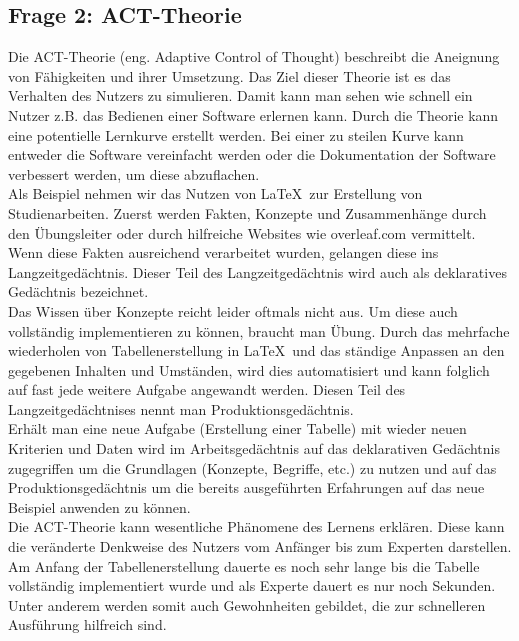 \documentclass{TUBAFarbeiten}
\begin{document}
\subsection{Frage 2: ACT-Theorie}
Die ACT-Theorie (eng. Adaptive Control of Thought) beschreibt die Aneignung von Fähigkeiten und ihrer Umsetzung. Das Ziel dieser Theorie ist es das Verhalten des Nutzers zu simulieren. Damit kann man sehen wie schnell ein Nutzer z.B. das Bedienen einer Software erlernen kann. 
Durch die Theorie kann eine potentielle Lernkurve erstellt werden. Bei einer zu steilen Kurve kann entweder die Software vereinfacht werden oder die Dokumentation der Software verbessert werden, um diese abzuflachen.\\

Als Beispiel nehmen wir das Nutzen von \LaTeX\ zur Erstellung von Studienarbeiten. Zuerst werden Fakten, Konzepte und Zusammenhänge durch den Übungsleiter oder durch hilfreiche Websites wie overleaf.com vermittelt. Wenn diese Fakten ausreichend verarbeitet wurden, gelangen diese ins Langzeitgedächtnis. Dieser Teil des Langzeitgedächtnis wird auch als deklaratives Gedächtnis bezeichnet.\\
Das Wissen über Konzepte reicht leider oftmals nicht aus. Um diese auch vollständig implementieren zu können, braucht man Übung. Durch das mehrfache wiederholen von Tabellenerstellung in \LaTeX\ und das ständige Anpassen an den gegebenen Inhalten und Umständen, wird dies automatisiert und kann folglich auf fast jede weitere Aufgabe angewandt werden.
Diesen Teil des Langzeitgedächtnises nennt man Produktionsgedächtnis.\\

Erhält man eine neue Aufgabe (Erstellung einer Tabelle) mit wieder neuen Kriterien und Daten wird im Arbeitsgedächtnis auf das deklarativen Gedächtnis zugegriffen um die Grundlagen (Konzepte, Begriffe, etc.) zu nutzen und auf das Produktionsgedächtnis um die bereits ausgeführten Erfahrungen auf das neue Beispiel anwenden zu können. \\

Die ACT-Theorie kann wesentliche Phänomene des
Lernens erklären. Diese kann die veränderte Denkweise des Nutzers vom Anfänger bis zum Experten darstellen. Am Anfang der Tabellenerstellung dauerte es noch sehr lange bis die Tabelle vollständig implementiert wurde und als Experte dauert es nur noch Sekunden. Unter anderem werden somit auch Gewohnheiten gebildet, die zur schnelleren Ausführung hilfreich sind.  
\end{document}
